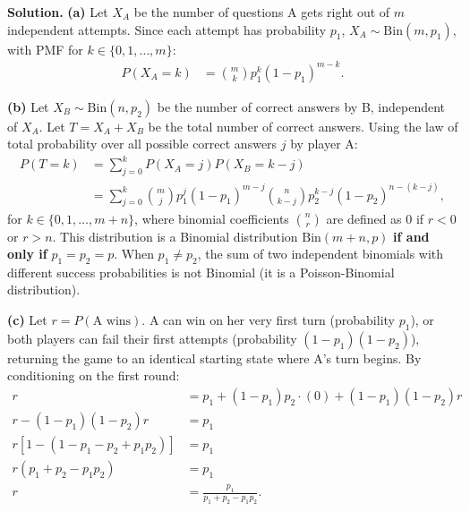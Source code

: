 \documentclass[11pt,a4paper]{article}
\begin{document}
\noindent \textbf{Solution.} \textbf{(a)} Let $X_A$ be the number of questions A gets right out of $m$ independent attempts. Since each attempt has probability $p_1$, $X_A \sim \text{Bin}(m, p_1)$, with PMF for $k \in \{0, 1, \dots, m\}$:
\begin{align*}
P(X_A = k) &= \binom{m}{k} p_1^k (1 - p_1)^{m-k}.
\end{align*}

\vspace{4pt}
\noindent \textbf{(b)} Let $X_B \sim \text{Bin}(n, p_2)$ be the number of correct answers by B, independent of $X_A$. Let $T = X_A + X_B$ be the total number of correct answers. Using the law of total probability over all possible correct answers $j$ by player A:
\begin{align*}
P(T = k) &= \sum_{j=0}^{k} P(X_A = j) P(X_B = k - j) \\
&= \sum_{j=0}^{k} \binom{m}{j} p_1^j (1 - p_1)^{m-j} \binom{n}{k-j} p_2^{k-j} (1 - p_2)^{n-(k-j)},
\end{align*}
for $k \in \{0, 1, \dots, m+n\}$, where binomial coefficients $\binom{n}{r}$ are defined as $0$ if $r < 0$ or $r > n$. 
This distribution is a Binomial distribution $\text{Bin}(m+n, p)$ \textbf{if and only if} $p_1 = p_2 = p$. When $p_1 \neq p_2$, the sum of two independent binomials with different success probabilities is not Binomial (it is a Poisson-Binomial distribution).

\vspace{4pt}
\noindent \textbf{(c)} Let $r = P(\text{A wins})$. A can win on her very first turn (probability $p_1$), or both players can fail their first attempts (probability $(1 - p_1)(1 - p_2)$), returning the game to an identical starting state where A's turn begins. By conditioning on the first round:
\begin{align*}
r &= p_1 + (1 - p_1) p_2 \cdot (0) + (1 - p_1)(1 - p_2) r \\
r - (1 - p_1)(1 - p_2) r &= p_1 \\
r \left[ 1 - (1 - p_1 - p_2 + p_1 p_2) \right] &= p_1 \\
r (p_1 + p_2 - p_1 p_2) &= p_1 \\
r &= \frac{p_1}{p_1 + p_2 - p_1 p_2}.
\end{align*}

\vspace{10pt}
\end{document}
